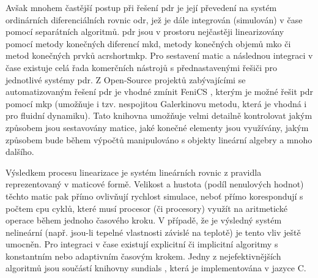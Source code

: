 
Avšak mnohem častější postup při řešení \acrshort{pdr} je její převedení na
systém ordinárních diferenciálních rovnic \acrshort{odr}, jež je dále
integrován (simulován) v čase pomocí separátních algoritmů. \acrshort{pdr} jsou
v prostoru nejčastěji linearizovány pomocí metody konečných diferencí
\acrshort{mkd}, metody konečných objemů \acrshort{mko} či metod konečných prvků
acrshort{mkp}. Pro sestavení matic a následnou integraci v čase existuje
celá řada komerčních nástrojů s přednastavenými řešiči pro jednotlivé systémy
\acrshort{pdr}. Z Open-Source projektů zabývajícími se automatizovaným řešení
\acrshort{pdr} je vhodné zmínit FeniCS \cite{AlnaesBlechta2015a}, kterým je
možné řešit \acrshort{pdr} pomocí \acrshort{mkp} (umožňuje i tzv. nespojitou
Galerkinovu metodu, která je vhodná i pro fluidní dynamiku). Tato knihovna
umožňuje velmi detailně kontrolovat jakým způsobem jsou sestavovány matice,
jaké konečné elementy jsou využívány, jakým způsobem bude během výpočtů
manipulováno s objekty lineární algebry a mnoho dalšího.

Výsledkem procesu linearizace je systém lineárních rovnic z pravidla
reprezentovaný v maticové formě. Velikost a hustota (podíl nenulových hodnot)
těchto matic pak přímo ovlivňují rychlost simulace, neboť přímo korespondují s
počtem \acrshort{cpu} cyklů, které musí procesor (či procesory) využít na
aritmetické operace během jednoho časového kroku. V případě, že je výsledný
systém nelineární (např. jsou-li tepelné vlastnosti závislé na teplotě) je
tento vliv ještě umocněn. Pro integraci v čase existují explicitní či
implicitní algoritmy s konstantním nebo adaptivním časovým krokem. Jedny z
nejefektivnějších algoritmů jsou součástí knihovny \acrshort{sundials}
\cite{sundials}, která je implementována v jazyce C.

